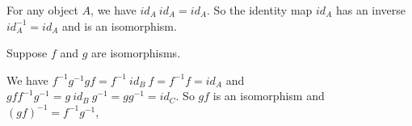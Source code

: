 For any object $A$, we have $id_A ~ id_A = id_A$. So the identity map $id_A$ has an inverse $id_A^{-1} = id_A$ and is an isomorphism.

Suppose $f$ and $g$ are isomorphisms.
\begin{center}\end{center}
We have $f^{-1} g^{-1} g f = f^{-1} ~ id_B ~ f = f^{-1} f = id_A$ and $g f f^{-1} g^{-1} = g ~ id_B ~ g^{-1} = g g^{-1} = id_C$. So $gf$ is an isomorphism and $(gf)^{-1} = f^{-1} g^{-1}$,